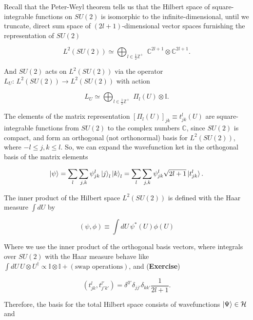 \noindent Recall that the Peter-Weyl theorem tells us that the Hilbert space of square-integrable functions on $SU(2)$ is isomorphic to the infinite-dimensional, until we truncate, direct sum space of $(2l+1)$-dimensional vector spaces furnishing the representation of $SU(2)$

\begin{equation}
L^2 (SU(2)) \simeq \bigoplus_{l \in \frac{1}{2}\mathbb{Z}^+} \,\, \mathbb{C}^{2l+1} \otimes \mathbb{C}^{2l+1}.
\end{equation}

\noindent And $SU(2)$ acts on $L^2 (SU(2))$ via the operator $L_U: \, L^2 (SU(2)) \rightarrow L^2 (SU(2))$ with action

\begin{equation}
L_U \simeq \bigoplus_{l \in \frac{1}{2}\mathbb{Z}^+} \,\, \Pi_l (U) \otimes \mathbb{I}.
\end{equation}

\noindent The elements of the matrix representation $[\Pi_l (U)]_{jk} \equiv t^l_{jk} (U)$ are square-integrable functions from $SU(2)$ to the complex numbers $\mathbb{C}$, since $SU(2)$ is compact, and form an orthogonal (not orthonormal) basis for $L^2 (SU(2))$, where $-l \le j,k \le l$. So, we can expand the wavefunction ket in the orthogonal basis of the matrix elements

\begin{equation}
\ket{\psi} = \sum_l \sum_{j,k} \psi^l_{jk} \ket{j}_l \ket{k}_l = \sum_l \sum_{j,k} \psi^l_{jk} \sqrt{2l+1} \ket{t^l_{jk}}.
\end{equation}

\noindent The inner product of the Hilbert space $L^2 (SU(2))$ is defined with the Haar measure $\int dU$ by

\begin{equation}
(\psi, \phi) \equiv \int dU \, \psi^* (U) \phi(U)
\end{equation}

\noindent Where we use the inner product of the orthogonal basis vectors, where integrals over $SU(2)$ with the Haar measure behave like $\int dU \, U \otimes U^\dagger \propto \mathbb{I} \otimes \mathbb{I} + (\text{swap operations})$, and (\textbf{Exercise})

\begin{equation}
(t^l_{jk}, t^{l'}_{j'k'}) = \delta^{ll'} \delta_{jj'} \delta_{kk'} \frac{1}{2l+1}.
\end{equation}

\noindent Therefore, the basis for the total Hilbert space consists of wavefunctions $\ket{\Psi} \in \mathcal{H}$ and

